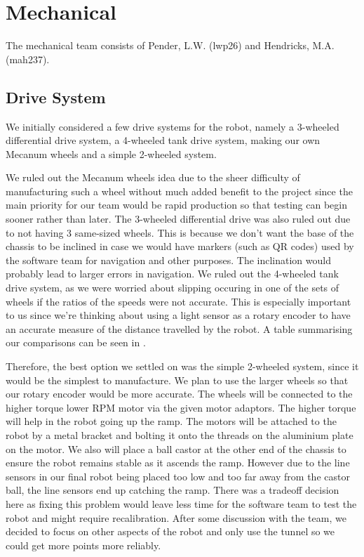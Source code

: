 \documentclass{article}
\begin{document}
\section{Mechanical}
\quad The mechanical team consists of Pender, L.W. (lwp26) and Hendricks, M.A. (mah237). 

\subsection{Drive System}
\quad \quad We initially considered a few drive systems for the robot, namely a 3-wheeled differential drive system, a 4-wheeled tank drive system, making our own Mecanum wheels and a simple 2-wheeled system. 

\quad We ruled out the Mecanum wheels idea due to the sheer difficulty of manufacturing such a wheel without much added benefit to the project since the main priority for our team would be rapid production so that testing can begin sooner rather than later. The 3-wheeled differential drive was also ruled out due to not having 3 same-sized wheels. This is because we don't want the base of the chassis to be inclined in case we would have markers (such as QR codes) used by the software team for navigation and other purposes. The inclination would probably lead to larger errors in navigation. We ruled out the 4-wheeled tank drive system, as we were worried about slipping occuring in one of the sets of wheels if the ratios of the speeds were not accurate. This is especially important to us since we're thinking about using a light sensor as a rotary encoder to have an accurate measure of the distance travelled by the robot. A table summarising our comparisons can be seen in .

\quad Therefore, the best option we settled on was the simple 2-wheeled system, since it would be the simplest to manufacture. We plan to use the larger wheels so that our rotary encoder would be more accurate. The wheels will be connected to the higher torque lower RPM motor via the given motor adaptors. The higher torque will help in the robot going up the ramp. The motors will be attached to the robot by a metal bracket and bolting it onto the threads on the aluminium plate on the motor. We also will place a ball castor at the other end of the chassis to ensure the robot remains stable as it ascends the ramp. However due to the line sensors in our final robot being placed too low and too far away from the castor ball, the line sensors end up catching the ramp. There was a tradeoff decision here as fixing this problem would leave less time for the software team to test the robot and might require recalibration. After some discussion with the team, we decided to focus on other aspects of the robot and only use the tunnel so we could get more points more reliably.
\end{document}
